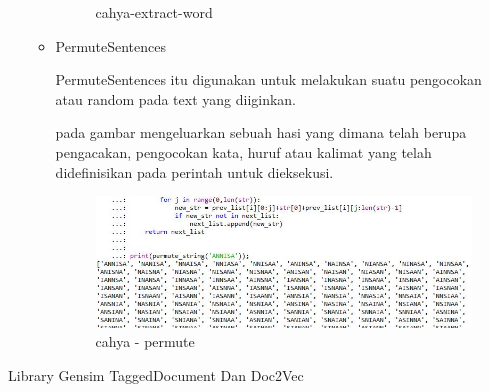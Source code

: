 \begin{enumerate}
\begin{itemize}
\begin{figure}[!hbtp]
\caption{cahya-extract-word}
\label{cahya-extraxt-word}
\end{figure}
\par
\par
\item PermuteSentences 
\par PermuteSentences itu  digunakan untuk melakukan suatu pengocokan atau random pada text yang diiginkan.
\par pada gambar  mengeluarkan sebuah hasi yang dimana telah berupa pengacakan, pengocokan kata, huruf atau kalimat yang telah didefinisikan pada perintah untuk dieksekusi. 
\par
\par
\begin{figure}[!hbtp]
\centering
\includegraphics[scale=0.2]{figures/cahya-permute.jpg}
\caption{cahya - permute}
\label{cahya - permute}
\end{figure}
\par
\par
\end{itemize}
\end{enumerate}
\par
\par
\par
\item Library Gensim TaggedDocument Dan Doc2Vec
